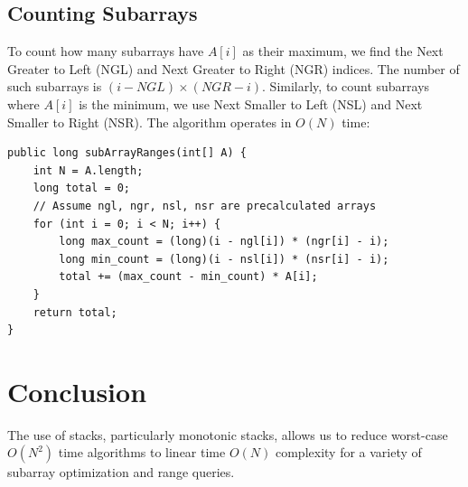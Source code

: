 \documentclass[10pt,journal,compsoc,onecolumn]{IEEEtran}
\begin{document}
\subsection{Counting Subarrays}
To count how many subarrays have $A[i]$ as their maximum, we find the Next Greater to Left (NGL) and Next Greater to Right (NGR) indices.
The number of such subarrays is $(i - NGL) \times (NGR - i)$.
Similarly, to count subarrays where $A[i]$ is the minimum, we use Next Smaller to Left (NSL) and Next Smaller to Right (NSR).
The algorithm operates in $O(N)$ time:
\begin{verbatim}
public long subArrayRanges(int[] A) {
    int N = A.length;
    long total = 0;
    // Assume ngl, ngr, nsl, nsr are precalculated arrays
    for (int i = 0; i < N; i++) {
        long max_count = (long)(i - ngl[i]) * (ngr[i] - i);
        long min_count = (long)(i - nsl[i]) * (nsr[i] - i);
        total += (max_count - min_count) * A[i];
    }
    return total;
}
\end{verbatim}

\section{Conclusion}
The use of stacks, particularly monotonic stacks, allows us to reduce worst-case $O(N^2)$ time algorithms to linear time $O(N)$ complexity for a variety of subarray optimization and range queries.
\end{document}
